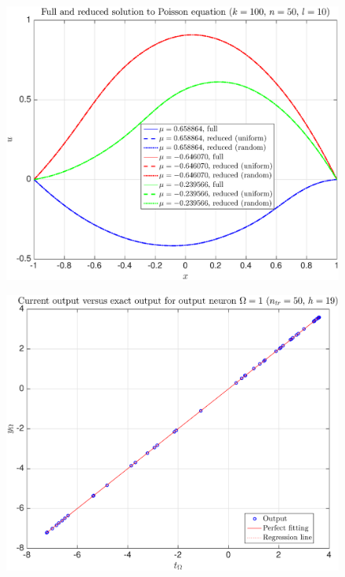 \documentclass[11pt,a4paper]{article}
\theoremstyle{definition}
\theoremstyle{theorem}
\begin{document}
	\begin{figure}
		\center
		\includegraphics[scale=0.5]{fig15}
		\caption{}
	\end{figure}
	
	\begin{figure}
		\center
		\includegraphics[scale=0.5]{fig16}
		\caption{}
	\end{figure}
	
\end{document}
